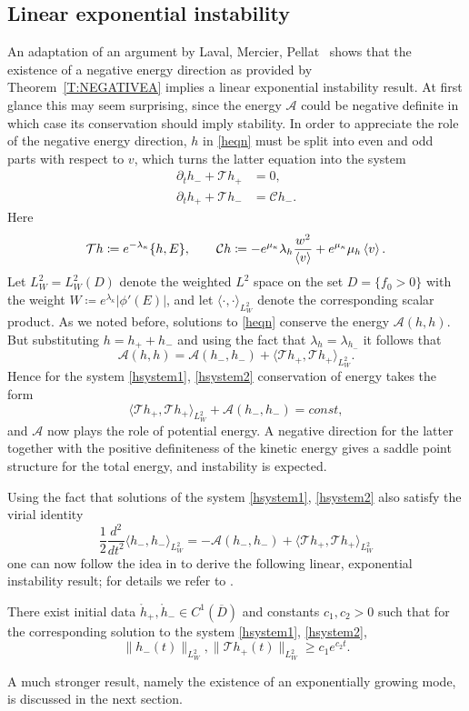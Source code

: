 \documentclass[11pt]{article}
\begin{document}
\subsection{Linear exponential instability}
%
%
An adaptation of an argument by
{\sc Laval, Mercier, Pellat}~\cite{LaMePe} shows
that the existence of a negative energy direction as provided by
Theorem~\ref{T:NEGATIVEA} implies a linear exponential instability result.
At first glance this may seem surprising, since the energy $\mathcal A$
could be negative definite in which case its conservation should
imply stability. In order to appreciate the role of
the negative energy direction, $h$ in \eqref{heqn} must be split
into even and odd parts with respect to $v$,
which turns the latter equation into the system
\begin{align}
  \partial_t h_- + \mathcal T h_+ & = 0,\label{hsystem1}\\
  \partial_t h_+  + \mathcal T h_- & =  \mathcal C h_- .\label{hsystem2}
\end{align}
Here
\[ 
\mathcal T h \coloneqq e^{-\lambda_\kappa}\{h,E\},\qquad
\mathcal C h \coloneqq
-e^{\mu_\kappa}\lambda_{h} \frac{w^2}{\left\langle v\right\rangle} + e^{\mu_\kappa} \mu_{h} \left\langle v\right\rangle.
\]
Let $L^2_{W}=L^2_{W}(D)$ denote the weighted $L^2$ space on the set
$D=\{f_0>0\}$
with the weight
$W \coloneqq e^{\lambda_\kappa}|\phi'(E)|$,  and let
$\langle\cdot,\cdot\rangle_{L^2_{W}}$ denote the corresponding scalar product.
As we noted before, solutions to  \eqref{heqn} conserve the energy
$\mathcal A (h,h)$.
But substituting $h=h_+ + h_-$ and using
the fact that $\lambda_h = \lambda_{h_-}$ it follows that
\[
\mathcal A(h,h) = \mathcal A(h_-,h_-)
+ \langle\mathcal T h_+,\mathcal T h_+\rangle_{L^2_{W}}.
\]
Hence for the system
\eqref{hsystem1}, \eqref{hsystem2} conservation of energy takes the form
\[ 
\langle\mathcal T h_+,\mathcal T h_+\rangle_{L^2_W} + \mathcal A (h_-,h_-)
= const,
\]
and $\mathcal A$ now plays the role
of potential energy. A negative direction for the latter together with the
positive definiteness of the kinetic energy gives a saddle point structure
for the total energy, and instability is expected.

Using the fact that solutions of the system
\eqref{hsystem1}, \eqref{hsystem2} also satisfy the virial identity
\[ 
\frac{1}{2}\frac{d^2}{dt^2}\langle h_-,h_-\rangle_{L^2_{W}} =
- \mathcal A(h_-,h_-) + \langle\mathcal T h_+,\mathcal T h_+\rangle_{L^2_{W}}
\]
one can now follow the idea in \cite{LaMePe} to derive
the following linear, exponential instability result; for details we refer to
\cite[Theorem~4.8]{HaLinRe}.
%
%
\begin{theorem} \label{lininstabEV}
  There exist initial data
  $\mathring h_+, \mathring h_-\in C^1(\overline{D})$ and constants $c_1,c_2>0$
  such that for the corresponding solution to the
  system \eqref{hsystem1}, \eqref{hsystem2},
  \[
  \|h_-(t)\|_{L^2_{W}} ,  \|\mathcal T h_+(t)\|_{L^2_{W}}
  \ge c_1 e^{c_2 t}.
  \]
\end{theorem}
%
A much stronger result, namely the existence of an exponentially
growing mode, is discussed in the next section.
%
%
\end{document}
